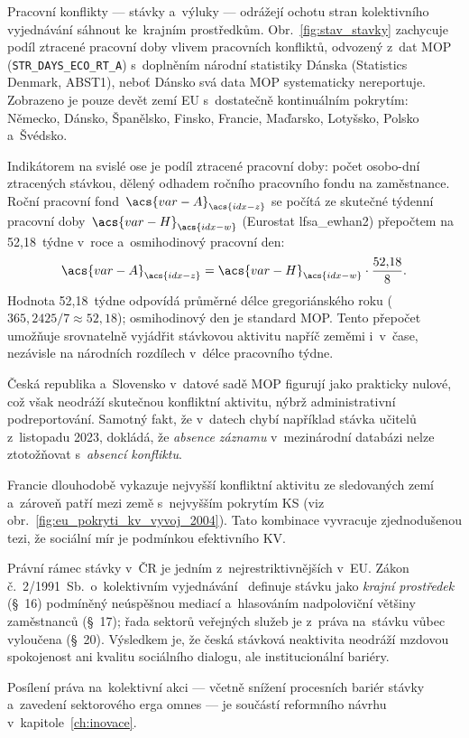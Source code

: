 
Pracovní konflikty --- stávky a~výluky --- odrážejí ochotu stran kolektivního
vyjednávání sáhnout ke~krajním prostředkům.
Obr.~\ref{fig:stav_stavky} zachycuje podíl ztracené pracovní doby
vlivem pracovních konfliktů, odvozený z~dat \ac{MOP}
(\texttt{STR\_DAYS\_ECO\_RT\_A}) s~doplněním národní statistiky Dánska
(Statistics Denmark, ABST1), neboť Dánsko svá data \ac{MOP} systematicky
nereportuje.
Zobrazeno je pouze devět zemí \ac{EU} s~dostatečně kontinuálním pokrytím:
Německo, Dánsko, Španělsko, Finsko, Francie, Maďarsko, Lotyšsko, Polsko a~Švédsko.

Indikátorem na svislé ose je podíl ztracené pracovní doby: počet osobo-dní
ztracených stávkou, dělený odhadem ročního pracovního fondu na zaměstnance.
Roční pracovní fond~$\acs{var-A}_{\acs{idx-z}}$ se počítá ze skutečné týdenní
pracovní doby~$\acs{var-H}_{\acs{idx-w}}$ (Eurostat lfsa\_ewhan2)
přepočtem na 52,18~týdne v~roce a~osmihodinový pracovní den:
\begin{equation}\label{eq:annual_workdays}
  \acs{var-A}_{\acs{idx-z}}
    = \acs{var-H}_{\acs{idx-w}} \cdot \frac{52{,}18}{8}.
\end{equation}
Hodnota 52,18~týdne odpovídá průměrné délce gregoriánského roku
($365{,}2425/7 \approx 52{,}18$); osmihodinový den je standard \acs{MOP}.
Tento přepočet umožňuje srovnatelně vyjádřit stávkovou aktivitu napříč zeměmi
i~v~čase, nezávisle na národních rozdílech v~délce pracovního týdne.



Česká republika a~Slovensko v~datové sadě \ac{MOP} figurují jako prakticky
nulové, což však neodráží skutečnou konfliktní aktivitu, nýbrž
administrativní podreportování.
Samotný fakt, že v~datech chybí například stávka učitelů z~listopadu 2023,
dokládá, že \emph{absence záznamu} v~mezinárodní databázi nelze ztotožňovat
s~\emph{absencí konfliktu}.

Francie dlouhodobě vykazuje nejvyšší konfliktní aktivitu ze sledovaných zemí
a~zároveň patří mezi země s~nejvyšším pokrytím \ac{KS}
(viz obr.~\ref{fig:eu_pokryti_kv_vyvoj_2004}).
Tato kombinace vyvracuje zjednodušenou tezi, že sociální mír je podmínkou
efektivního \ac{KV}.

Právní rámec stávky v~ČR je jedním z~nejrestriktivnějších v~\ac{EU}.
Zákon č.~2/1991~Sb.\ o~kolektivním vyjednávání~\cite{zakon_kv_1991}
definuje stávku jako \emph{krajní prostředek} (§~16) podmíněný neúspěšnou
mediací a~hlasováním nadpoloviční většiny zaměstnanců (§~17); řada sektorů
veřejných služeb je z~práva na~stávku vůbec vyloučena (§~20).
Výsledkem je, že česká stávková neaktivita neodráží mzdovou spokojenost
ani kvalitu sociálního dialogu, ale institucionální bariéry.

Posílení práva na~kolektivní akci --- včetně snížení procesních bariér stávky
a~zavedení sektorového erga omnes --- je součástí reformního návrhu
v~kapitole~\ref{ch:inovace}.
